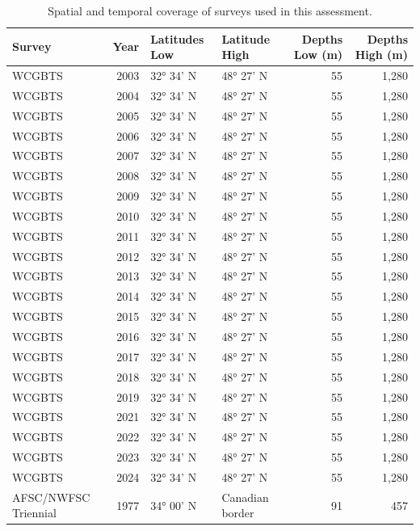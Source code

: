 \documentclass[
  english,
]{article}
\begin{document}
\begin{longtable}{lrllrr}

\caption{\label{tbl-survey_coverage}Spatial and temporal coverage of
surveys used in this assessment.}

\tabularnewline

\toprule
Survey & Year & Latitudes Low & Latitude High & Depths Low (m) & Depths High (m) \\ 
\midrule\addlinespace[2.5pt]
WCGBTS & 2003 &  32° 34' N & 48° 27' N & 55 & 1,280 \\ 
WCGBTS & 2004 &  32° 34' N & 48° 27' N & 55 & 1,280 \\ 
WCGBTS & 2005 &  32° 34' N & 48° 27' N & 55 & 1,280 \\ 
WCGBTS & 2006 &  32° 34' N & 48° 27' N & 55 & 1,280 \\ 
WCGBTS & 2007 &  32° 34' N & 48° 27' N & 55 & 1,280 \\ 
WCGBTS & 2008 &  32° 34' N & 48° 27' N & 55 & 1,280 \\ 
WCGBTS & 2009 &  32° 34' N & 48° 27' N & 55 & 1,280 \\ 
WCGBTS & 2010 &  32° 34' N & 48° 27' N & 55 & 1,280 \\ 
WCGBTS & 2011 &  32° 34' N & 48° 27' N & 55 & 1,280 \\ 
WCGBTS & 2012 &  32° 34' N & 48° 27' N & 55 & 1,280 \\ 
WCGBTS & 2013 &  32° 34' N & 48° 27' N & 55 & 1,280 \\ 
WCGBTS & 2014 &  32° 34' N & 48° 27' N & 55 & 1,280 \\ 
WCGBTS & 2015 &  32° 34' N & 48° 27' N & 55 & 1,280 \\ 
WCGBTS & 2016 &  32° 34' N & 48° 27' N & 55 & 1,280 \\ 
WCGBTS & 2017 &  32° 34' N & 48° 27' N & 55 & 1,280 \\ 
WCGBTS & 2018 &  32° 34' N & 48° 27' N & 55 & 1,280 \\ 
WCGBTS & 2019 &  32° 34' N & 48° 27' N & 55 & 1,280 \\ 
WCGBTS & 2021 &  32° 34' N & 48° 27' N & 55 & 1,280 \\ 
WCGBTS & 2022 &  32° 34' N & 48° 27' N & 55 & 1,280 \\ 
WCGBTS & 2023 &  32° 34' N & 48° 27' N & 55 & 1,280 \\ 
WCGBTS & 2024 &  32° 34' N & 48° 27' N & 55 & 1,280 \\ 
AFSC/NWFSC Triennial & 1977 &  34° 00' N & Canadian border & 91 & 457 \\ 

\end{longtable}
\end{document}
